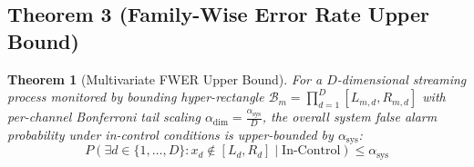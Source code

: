 \documentclass[a4paper,fleqn]{cas-sc}
\newtheorem{theorem}{Theorem}
\begin{document}
\subsection{Theorem 3 (Family-Wise Error Rate Upper Bound)}
\begin{theorem}[Multivariate FWER Upper Bound]
For a $D$-dimensional streaming process monitored by bounding hyper-rectangle $\mathcal{B}_m = \prod_{d=1}^D [L_{m,d}, R_{m,d}]$ with per-channel Bonferroni tail scaling $\alpha_{\text{dim}} = \frac{\alpha_{\text{sys}}}{D}$, the overall system false alarm probability under in-control conditions is upper-bounded by $\alpha_{\text{sys}}$:
\begin{equation}
P\left( \exists d \in \{1,\dots,D\}: x_d \notin [L_d, R_d] \mid \text{In-Control} \right) \le \alpha_{\text{sys}}
\end{equation}
\end{theorem}
\end{document}
